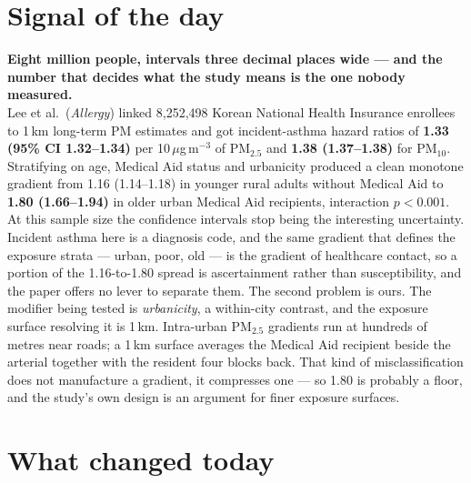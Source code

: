\documentclass[10pt]{article}
\begin{document}
\vspace{6mm}

\section*{\sffamily\bfseries\color{Deep}Signal of the day}
\vspace{-1.5mm}{\color{Amber}\rule{\linewidth}{1.1pt}}\vspace{2.5mm}

\begin{keybox}
{\sffamily\bfseries\small\color{Deep}Eight million people, intervals three decimal places
wide --- and the number that decides what the study means is the one nobody
measured.}\\[1.4mm]
\footnotesize
Lee et al.\ (\textit{Allergy}) linked 8{,}252{,}498 Korean National Health Insurance
enrollees to 1\,km long-term PM estimates and got incident-asthma hazard ratios of
\textbf{1.33 (95\% CI 1.32--1.34)} per 10\,$\mu$g\,m$^{-3}$ of PM$_{2.5}$ and
\textbf{1.38 (1.37--1.38)} for PM$_{10}$. Stratifying on age, Medical Aid status and
urbanicity produced a clean monotone gradient from 1.16 (1.14--1.18) in younger rural
adults without Medical Aid to \textbf{1.80 (1.66--1.94)} in older urban Medical Aid
recipients, interaction $p<0.001$. At this sample size the confidence intervals stop being
the interesting uncertainty. Incident asthma here is a diagnosis code, and the same
gradient that defines the exposure strata --- urban, poor, old --- is the gradient of
healthcare contact, so a portion of the 1.16-to-1.80 spread is ascertainment rather than
susceptibility, and the paper offers no lever to separate them. The second problem is
ours. The modifier being tested is \emph{urbanicity}, a within-city contrast, and the
exposure surface resolving it is 1\,km. Intra-urban PM$_{2.5}$ gradients run at hundreds of
metres near roads; a 1\,km surface averages the Medical Aid recipient beside the arterial
together with the resident four blocks back. That kind of misclassification does not
manufacture a gradient, it compresses one --- so 1.80 is probably a floor, and the study's
own design is an argument for finer exposure surfaces.
\end{keybox}

\vspace{3mm}

\section*{\sffamily\bfseries\color{Deep}What changed today}
\vspace{-1.5mm}{\color{Amber}\rule{\linewidth}{1.1pt}}\vspace{2.5mm}
\end{document}
